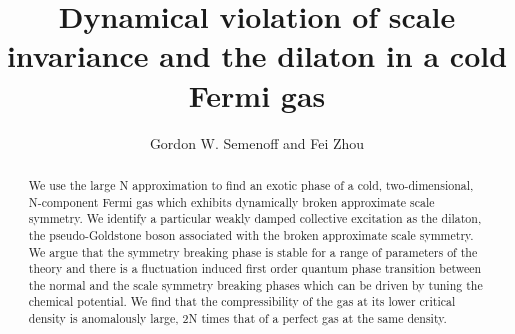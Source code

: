 \documentclass[twocolumn,secnumarabic,amssymb, nobibnotes, aps, prd]{revtex4}
\begin{document}
\title{Dynamical violation of scale invariance and the dilaton in a cold Fermi gas}

\author{Gordon W. Semenoff and Fei Zhou }

\begin{abstract}
We use the large N approximation to find an exotic phase of a cold, two-dimensional, 
N-component Fermi gas which 
exhibits dynamically broken approximate scale symmetry.   
 We identify a particular weakly damped  
 collective excitation  as the dilaton,
the pseudo-Goldstone boson associated with the
broken approximate scale symmetry.   We argue that the symmetry breaking phase is stable for
a range of parameters of the theory and there is a fluctuation induced first order
  quantum  phase transition between the normal
and the scale symmetry breaking phases which can be driven by tuning the chemical potential.
We find that the compressibility of the gas at its lower critical density is anomalously large,
2N times that of a perfect gas at the same density.
\end{abstract}

\maketitle



 
\end{document}
